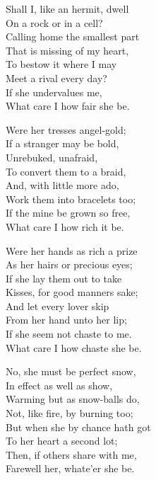 \settowidth{\versewidth}{Calling home the smallest part}
\begin{dcverse}
\begin{patverse}
Shall I, like an hermit, dwell\\
On a rock or in a cell?\\
Calling home the smallest part\\
That is missing of my heart,\\
To bestow it where I may\\
Meet a rival every day?\\
If she undervalues me,\\
What care I how fair she be.
\end{patverse}

\begin{patverse}
Were her tresses angel-gold;\\
If a stranger may be bold,\\
Unrebuked, unafraid,\\
To convert them to a braid,\\
And, with little more ado,\\
Work them into bracelets too;\\
If the mine be grown so free,\\
What care I how rich it be.
\end{patverse}

\begin{patverse}
Were her hands as rich a prize\\
As her hairs or precious eyes;\\
If she lay them out to take\\
Kisses, for good manners sake;\\
And let every lover skip\\
From her hand unto her lip;\\
If she seem not chaste to me.\\
What care I how chaste she be.
\end{patverse}

\begin{patverse}
No, she must be perfect snow,\\
In effect as well as show,\\
Warming but as snow-balls do,\\
Not, like fire, by burning too;\\
But when she by chance hath got\\
To her heart a second lot;\\
Then, if others share with me,\\
Farewell her, whate’er she be.
\end{patverse}
\end{dcverse}
\pagebreak

